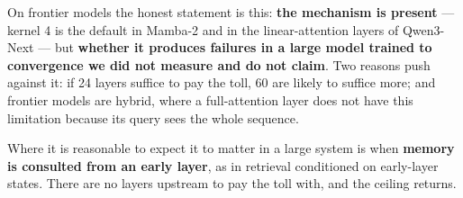 \documentclass[11pt,a4paper]{article}
\begin{document}
On frontier models the honest statement is this: \textbf{the mechanism is present} --- kernel 4 is the
default in Mamba-2 and in the linear-attention layers of Qwen3-Next --- but \textbf{whether it
produces failures in a large model trained to convergence we did not measure and do not claim}. Two
reasons push against it: if 24 layers suffice to pay the toll, 60 are likely to suffice more; and
frontier models are hybrid, where a full-attention layer does not have this limitation because its
query sees the whole sequence.

Where it is reasonable to expect it to matter in a large system is when \textbf{memory is consulted
from an early layer}, as in retrieval conditioned on early-layer states. There are no layers upstream
to pay the toll with, and the ceiling returns.

\vspace{1em}
\begin{center}
\end{center}
\end{document}
